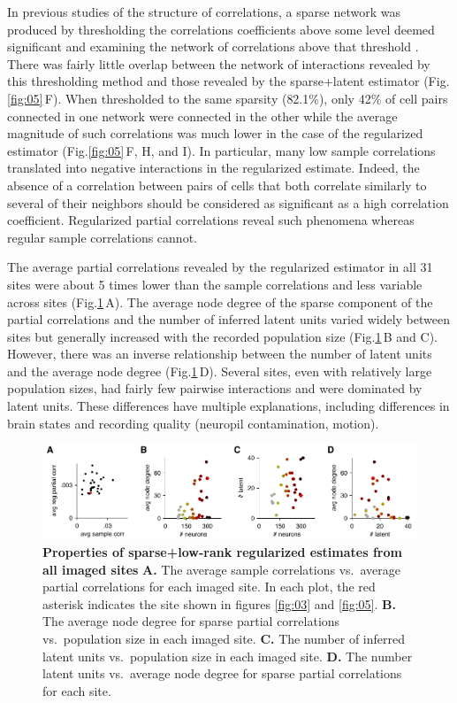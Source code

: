 \documentclass[10pt]{article}
\begin{document}
In previous studies of the structure of correlations, a sparse network was produced by thresholding the correlations coefficients  above some level deemed significant and examining the network of correlations above that threshold \cite{Golshani:2009,Malmersjo:2013}. There was fairly little overlap between the network of interactions revealed by this thresholding method and those revealed by the sparse+latent estimator (Fig.\;\ref{fig:05}\,F). When thresholded to the same sparsity (82.1\%), only 42\% of cell pairs connected in one network were connected in the other while the average magnitude of such correlations was much lower in the case of the regularized estimator (Fig.\;\ref{fig:05}\,F, H, and I). In particular, many low sample correlations translated into negative interactions in the regularized estimate. Indeed, the absence of a correlation between pairs of cells that both correlate similarly to several of their neighbors should be considered as significant as a high correlation coefficient. Regularized partial correlations reveal such phenomena whereas regular sample correlations cannot.

The average partial correlations  revealed by the regularized estimator in all 31 sites were about 5 times lower than the sample correlations and  less variable across sites (Fig.\;\ref{fig:06}\,A). The average node degree of the sparse component of the partial correlations and the number of  inferred latent units varied widely between sites but generally increased with the recorded population size (Fig.\;\ref{fig:06}\,B and C). However, there was an inverse relationship between the number of latent units and the average node degree (Fig.\;\ref{fig:06}\,D). Several sites, even with relatively large population sizes, had fairly few pairwise interactions and were dominated by latent units.  These differences have multiple explanations, including differences in brain states and recording quality (neuropil contamination, motion). 

\begin{figure}[!ht]
    \begin{center}
        \includegraphics{./figures/Figure06.pdf}
    \end{center}
    \caption{{\bf Properties of sparse+low-rank regularized estimates from all imaged sites}
    {\bf A.} The average sample correlations vs.~average partial correlations for each imaged site. In each plot, the red asterisk indicates the site shown in figures \ref{fig:03} and \ref{fig:05}.
    {\bf B.} The average node degree for sparse partial correlations vs.~population size in each imaged site. 
    {\bf C.} The number of inferred latent units vs.~population size in each imaged site.
    {\bf D.} The number latent units vs.~average node degree for sparse partial correlations for each site.
}
\label{fig:06}
\end{figure}
\end{document}
